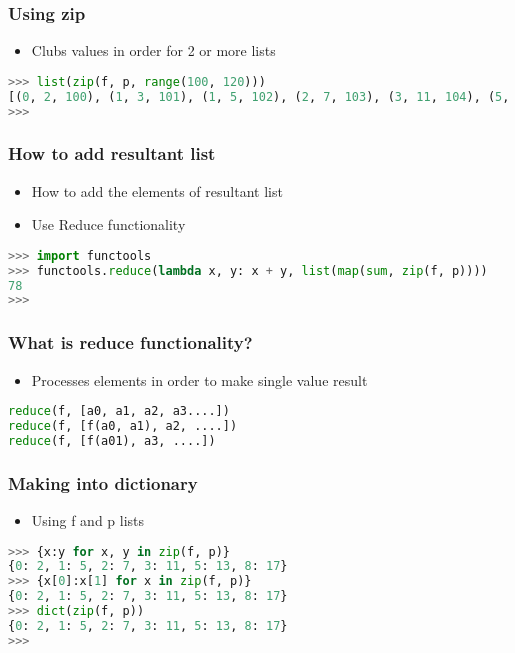 \documentclass[14pt]{beamer}
\begin{document}
    \begin{frame}[containsverbatim]
        \frametitle{Using zip}
		\begin{itemize}
		\item Clubs values in order for 2 or more lists
		\end{itemize}
        \begin{lstlisting}[language=Python]
>>> list(zip(f, p, range(100, 120)))
[(0, 2, 100), (1, 3, 101), (1, 5, 102), (2, 7, 103), (3, 11, 104), (5, 13, 105), (8, 17, 106)]
>>> 
        \end{lstlisting}
    \end{frame}

    \begin{frame}[containsverbatim]
        \frametitle{How to add resultant list}
		\begin{itemize}
		\item How to add the elements of resultant list
		\item \alert {Use Reduce functionality}
		\end{itemize}
        \begin{lstlisting}[language=Python]
>>> import functools
>>> functools.reduce(lambda x, y: x + y, list(map(sum, zip(f, p))))
78
>>>
        \end{lstlisting}
    \end{frame}

    \begin{frame}[containsverbatim]
        \frametitle{What is reduce functionality?}
        \begin{itemize}
		\item Processes elements in order to make single value result
		\end{itemize}
        \begin{lstlisting}[language=Python]
reduce(f, [a0, a1, a2, a3....])
reduce(f, [f(a0, a1), a2, ....])
reduce(f, [f(a01), a3, ....])
        \end{lstlisting}
    \end{frame}

    \begin{frame}[containsverbatim]
        \frametitle{Making into dictionary}
        \begin{itemize}
		\item Using f and p lists
		\end{itemize}
        \begin{lstlisting}[language=Python]
>>> {x:y for x, y in zip(f, p)}
{0: 2, 1: 5, 2: 7, 3: 11, 5: 13, 8: 17}
>>> {x[0]:x[1] for x in zip(f, p)}
{0: 2, 1: 5, 2: 7, 3: 11, 5: 13, 8: 17}
>>> dict(zip(f, p))
{0: 2, 1: 5, 2: 7, 3: 11, 5: 13, 8: 17}
>>>
   \end{lstlisting}
    \end{frame}
\end{document}
